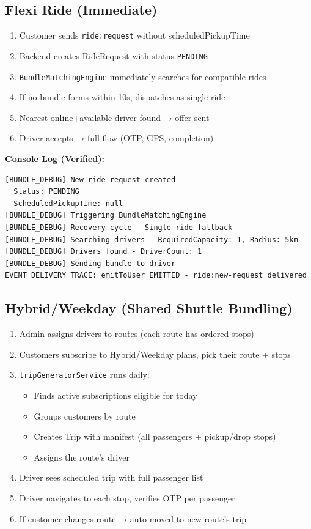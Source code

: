 \documentclass[11pt,a4paper]{article}
\begin{document}
\subsection{Flexi Ride (Immediate)}
\begin{enumerate}
  \item Customer sends \texttt{ride:request} without scheduledPickupTime
  \item Backend creates RideRequest with status \texttt{PENDING}
  \item \texttt{BundleMatchingEngine} immediately searches for compatible rides
  \item If no bundle forms within 10s, dispatches as single ride
  \item Nearest online+available driver found → offer sent
  \item Driver accepts → full flow (OTP, GPS, completion)
\end{enumerate}

\textbf{Console Log (Verified):}
\begin{lstlisting}
[BUNDLE_DEBUG] New ride request created
  Status: PENDING
  ScheduledPickupTime: null
[BUNDLE_DEBUG] Triggering BundleMatchingEngine
[BUNDLE_DEBUG] Recovery cycle - Single ride fallback
[BUNDLE_DEBUG] Searching drivers - RequiredCapacity: 1, Radius: 5km
[BUNDLE_DEBUG] Drivers found - DriverCount: 1
[BUNDLE_DEBUG] Sending bundle to driver
EVENT_DELIVERY_TRACE: emitToUser EMITTED - ride:new-request delivered
\end{lstlisting}

\subsection{Hybrid/Weekday (Shared Shuttle Bundling)}
\begin{enumerate}
  \item Admin assigns drivers to routes (each route has ordered stops)
  \item Customers subscribe to Hybrid/Weekday plans, pick their route + stops
  \item \texttt{tripGeneratorService} runs daily:
    \begin{itemize}
      \item Finds active subscriptions eligible for today
      \item Groups customers by route
      \item Creates Trip with manifest (all passengers + pickup/drop stops)
      \item Assigns the route's driver
    \end{itemize}
  \item Driver sees scheduled trip with full passenger list
  \item Driver navigates to each stop, verifies OTP per passenger
  \item If customer changes route → auto-moved to new route's trip
\end{enumerate}
\end{document}
